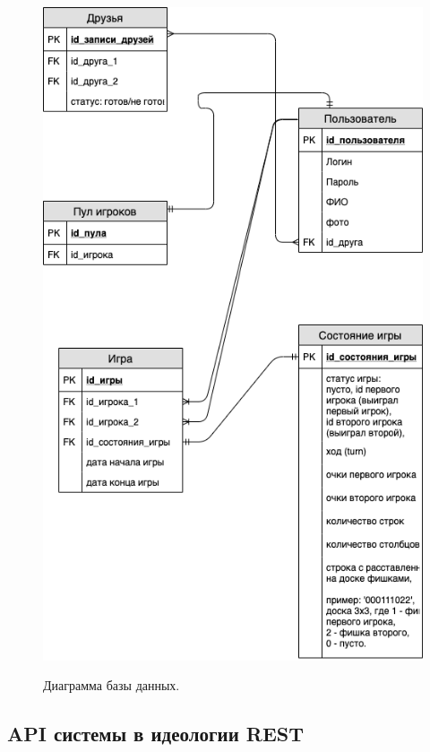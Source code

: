 \documentclass[a4paper,14pt]{extarticle}
\begin{document}
 	\begin{figure}[h!]
 		\begin{center}
 			{\includegraphics[scale = 0.35]{img/database_diagram.png}}
 			\label{ris:bd}
 		\end{center}
 		\caption{Диаграмма базы данных.}
 	\end{figure}
 
 	\subsection{API системы в идеологии REST}
 	
\end{document}
